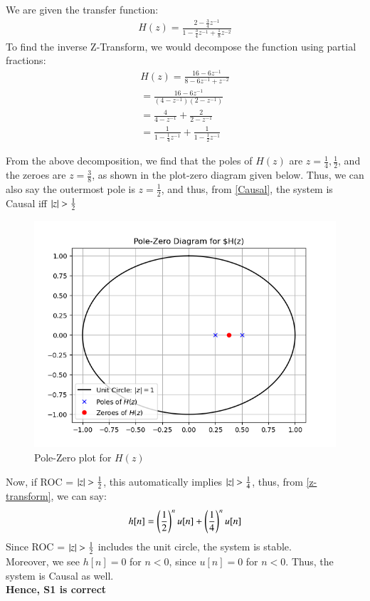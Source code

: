 \documentclass[journal,12pt,twocolumn]{IEEEtran}
\begin{document}
We are given the transfer function:
\begin{align}
    H(z) = \frac{2 - \frac{3}{4}z^{-1}}{1 - \frac{3}{4}z^{-1} + \frac{1}{8}z^{-2}}
\end{align}
To find the inverse Z-Transform, we would decompose the function using partial fractions:
\begin{align}
    H(z) = \frac{16 - 6z^{-1}}{8 - 6z^{-1} + z^{-2}}\\
     = \frac{16 - 6z^{-1}}{(4 - z^{-1})(2 - {z^{-1}})}\\
      = \frac{4}{4 - z^{-1}} +\frac{2}{2 - z^{-1}}\\
       = \frac{1}{1 - \frac{1}{4}z^{-1}} + \frac{1}{1 - \frac{1}{2}z^{-1}}
       \label{partial-fraction}
\end{align}

From the above decomposition, we find that the poles of $H(z)$ are $z = \frac{1}{4} , \frac{1}{2}$, and the zeroes are $z = \frac{3}{8}$, as shown in the plot-zero diagram given below.
Thus, we can also say the outermost pole is $z = \frac{1}{2}$, and thus, from \eqref{Causal}, the system is Causal iff $\left\vert z\right\vert > \frac{1}{2}$

 \begin{figure}[!ht]
\centering
 \includegraphics[width=\columnwidth]{Graphs/Pole-zero.png}
 \caption{Pole-Zero plot for $H(z)$}
 \end{figure}

Now, if ROC = $\left\vert z\right\vert>\frac{1}{2}$, this automatically implies $\left\vert z\right\vert > \frac{1}{4}$, thus, from \eqref{z-transform}, we can say:
\begin{align}
    h[n] = \left(\frac{1}{2}\right)^n u[n] + \left(\frac{1}{4}\right)^n u[n] 
\end{align}
Since ROC = $\left\vert z\right\vert>\frac{1}{2}$ includes the unit circle, the system is stable.\\
Moreover, we see $h[n] = 0 $
 for $n < 0$, since $u[n] = 0$ for $n< 0$. Thus, the system is Causal as well.\\\textbf{ Hence, S1 is correct}\\
 
\end{document}
